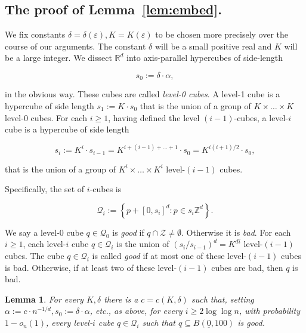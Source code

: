 \documentclass[11pt]{article}%
\newtheorem{lemma}[lemma]{Lemma}
\newcommand{\Qcal}[0]{\ensuremath{{\mathcal Q}}}
\newcommand{\Zcal}[0]{\ensuremath{{\mathcal Z}}}
\newcommand{\eR}[0]{\ensuremath{ \mathbb R}}
\newcommand{\Zed}[0]{\ensuremath{ \mathbb Z}}
\newcommand{\eps}{\varepsilon}
\newcommand{\orig}{\underline{0}}
\begin{document}
\subsection{The proof of Lemma~\ref{lem:embed}.}

We fix constants $\delta=\delta(\eps),K=K(\eps)$ to be chosen more precisely over the 
course of our arguments. The constant $\delta$ will be a small positive real and $K$ will be a
large integer.
We dissect $\eR^d$ into axis-parallel hypercubes of side-length 

$$s_0 := \delta\cdot\alpha, $$ 

\noindent 
in the obvious way. These cubes are called {\em level-0 cubes}.
A level-1 cube is a hypercube of side length $s_1 := K\cdot s_0$ 
that is the union of a group of $K\times\dots\times K$ level-0 cubes.
For each $i \geq 1$, having defined the level $(i-1)$-cubes, a level-$i$ cube
is a hypercube of side length 

\begin{equation}\label{eq:sidef} 
s_i := K^{i} \cdot s_{i-1} = K^{i+(i-1)+\dots+1} \cdot s_0
= K^{i(i+1)/2} \cdot s_0,  
\end{equation}

\noindent
that is the union of a group of $K^{i}\times\dots\times K^{i}$ level-$(i-1)$ cubes.

Specifically, the set of $i$-cubes is 

$$ \Qcal_i := \left\{ p + [0,s_i]^d : p \in s_{i} \Zed^d \right\}. $$

We say a level-0 cube $q \in \Qcal_0$ is {\em good} if $q \cap \Zcal \neq \emptyset$. Otherwise it is {\em bad}.
For each $i \geq 1$, each level-$i$ cube $q \in \Qcal_i$ is the union of $(s_i/s_{i-1})^d = K^{di}$ level-$(i-1)$ cubes.
The cube $q\in\Qcal_i$ is called {\em good} if at most one of these level-$(i-1)$ cubes is bad.
Otherwise, if at least two of these level-$(i-1)$ cubes are bad, then $q$ is bad.

\begin{lemma}\label{lem:boxes}
For every $K, \delta$ there is a $c = c(K,\delta)$ such that, 
setting $\alpha := c \cdot n^{-1/d}, s_0 := \delta \cdot \alpha$, etc., as above, for every $i \geq 2 \log\log n$, 
with probability $1-o_n(1)$, every level-$i$ cube $q \in \Qcal_i$ such that 
$q \subseteq B(\orig,100)$ is good.
\end{lemma}
\end{document}
